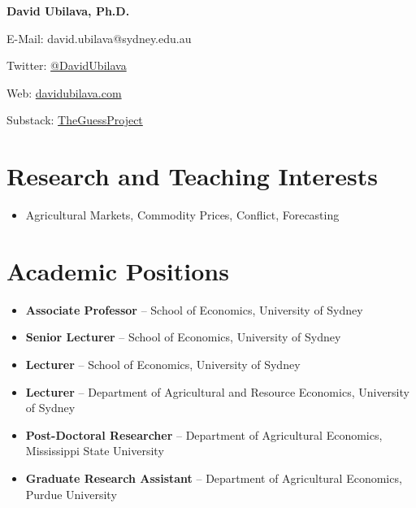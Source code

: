 \documentclass[10pt]{article}
\begin{document}
	
	
	
	\hspace{0.00in}\Large{\bfseries{David Ubilava, Ph.D.}}
	\normalsize
	
	\medskip
	
	{E-Mail: david.ubilava@sydney.edu.au}
	
	\smallskip
	
	{Twitter: \href{https://twitter.com/DavidUbilava}{@DavidUbilava}}
	
	\smallskip
	
	{Web: \href{https://davidubilava.com}{davidubilava.com}}
	
	\smallskip
	
	{Substack: \href{https://theguessproject.substack.com}{TheGuessProject}}

	\medskip

	
	\section*{Research and Teaching Interests}
	\begin{itemize}
		\item Agricultural Markets, Commodity Prices, Conflict, Forecasting
	\end{itemize}
	
	\section*{Academic Positions}
	\begin{itemize}
		\item {} \textbf{Associate Professor} -- School of Economics, University of Sydney
		\item {} \textbf{Senior Lecturer} -- School of Economics, University of Sydney
		\item {} \textbf{Lecturer} -- School of Economics, University of Sydney
		\item {} \textbf{Lecturer} -- Department of Agricultural and Resource Economics, University of Sydney
		\item {} \textbf{Post-Doctoral Researcher} -- Department of Agricultural Economics, Mississippi State University
		\item {} \textbf{Graduate Research Assistant} -- Department of Agricultural Economics, Purdue University
	\end{itemize}
	
\end{document}

